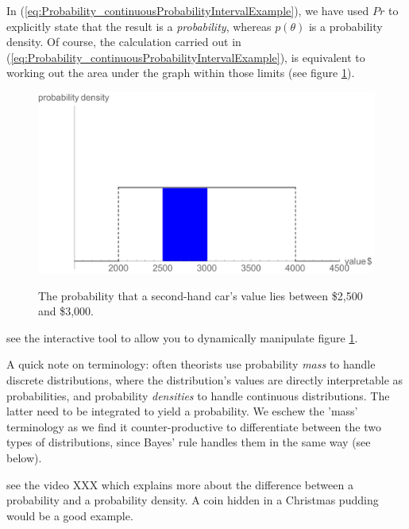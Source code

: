 \documentclass[11pt,fullpage]{book}
\begin{document}
In (\ref{eq:Probability_continuousProbabilityIntervalExample}), we have used $Pr$ to explicitly state that the result is a \textit{probability}, whereas $p(\theta)$ is a probability density. Of course, the calculation carried out in (\ref{eq:Probability_continuousProbabilityIntervalExample}), is equivalent to working out the area under the graph within those limits (see figure \ref{fig:Probability_continuousLotteryInterval}).

\begin{figure}
\centering
\scalebox{0.5} 
{\includegraphics{Probability_continuousLotteryInterval.pdf}}
\caption{The probability that a second-hand car's value lies between \$2,500 and \$3,000.}\label{fig:Probability_continuousLotteryInterval}
\end{figure}

 see the interactive tool to allow you to dynamically manipulate figure \ref{fig:Probability_continuousLotteryInterval}.

A quick note on terminology: often theorists use probability \textit{mass} to handle discrete distributions, where the distribution's values are directly interpretable as probabilities, and probability \textit{densities} to handle continuous distributions. The latter need to be integrated to yield a probability. We eschew the 'mass' terminology as we find it counter-productive to differentiate between the two types of distributions, since Bayes' rule handles them in the same way (see below).

 see the video XXX which explains more about the difference between a probability and a probability density. A coin hidden in a Christmas pudding would be a good example.
\end{document}
